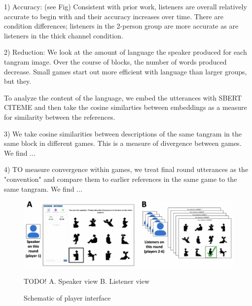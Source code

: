 \documentclass[11pt,a4paper]{article}
\begin{document}
1) Accuracy: (see Fig) Consistent with prior work, listeners are overall relatively accurate to begin with and their accuracy increases over time. There are condition differences; listeners in the 2-person group are more accurate as are listeners in the thick channel condition. 

2) Reduction: We look at the amount of language the speaker produced for each tangram image. Over the course of blocks, the number of words produced decrease. Small games start out more efficient with language than larger groups, but they.

To analyze the content of the language, we embed the utterances with SBERT CITEME and then take the cosine similarties between embeddings as a measure for similarity between the references. 

3) We take cosine similarities between descriptions of the same tangram in the same block in different games. This is a measure of divergence between games. We find ...

4) TO measure convergence within games, we treat final round utterances as the "convention" and compare them to earlier references in the same game to the same tangram. We find ...


\newpage

\begin{figure}
	\includegraphics[width=\textwidth]{../images/interface-1.pdf}
	\caption{Schematic of player interface}{TODO! A. Speaker view B. Listener view}
\end{figure}
\end{document}
